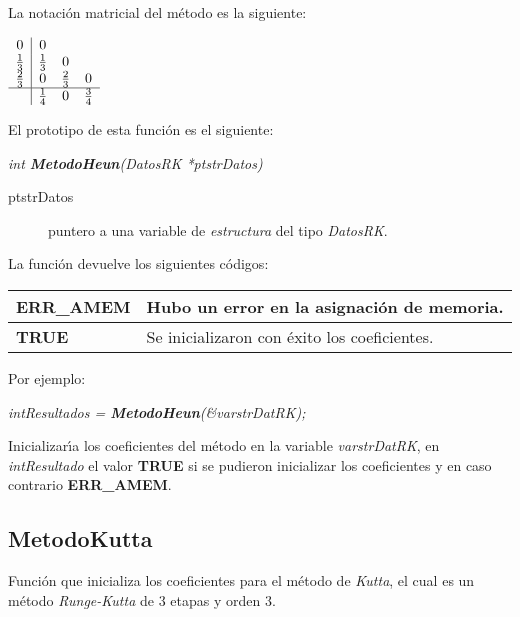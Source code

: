 La notaci\'on matricial del m\'etodo es la siguiente:

\begin{center}
$
\begin{array}{c|ccc}
0 & 0 \\
\frac{1}{3} & \frac{1}{3} & 0 \\
\frac{2}{3} & 0 & \frac{2}{3} & 0 \\
\hline
 & \frac{1}{4} & 0 & \frac{3}{4}
\end{array}
$
\end{center}

El prototipo de esta funci\'on es el siguiente:

\begin{center}
\emph{int \textbf{MetodoHeun}(DatosRK *ptstrDatos)}
\end{center}

\begin{description}
\item[ptstrDatos] puntero a una variable de \emph{estructura} del tipo
\emph{DatosRK}.
\end{description}

La funci\'on devuelve los siguientes c\'odigos:

\begin{center}
\begin{tabular}{|l|l|}
\hline
\textbf{ERR\_AMEM} & Hubo un error en la asignaci\'on de memoria. \\
\hline
\textbf{TRUE} & Se inicializaron con \'exito los coeficientes. \\
\hline
\end{tabular}
\end{center}

Por ejemplo:

\begin{center}
\emph{intResultados = \textbf{MetodoHeun}(\&varstrDatRK);}
\end{center}

Inicializar\'{\i}a los coeficientes del m\'etodo en la variable
\emph{varstrDatRK}, en \emph{intResultado} el valor \textbf{TRUE} si se pudieron
inicializar los coeficientes y en caso contrario \textbf{ERR\_AMEM}.

\newpage

\subsection{MetodoKutta}
Funci\'on que inicializa los coeficientes para el m\'etodo de \emph{Kutta}, el
cual es un m\'etodo \emph{Runge-Kutta} de $3$ etapas y orden $3$.\newline

